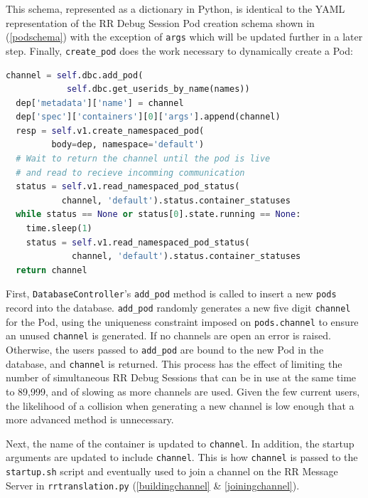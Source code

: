 \documentclass[12pt]{article}
\begin{document}
This schema, represented as a dictionary in Python, is identical to
the YAML representation of the RR Debug Session Pod creation schema
shown in (\ref{podschema}) with the exception of \lstinline{args}
which will be updated further in a later step.  Finally,
\lstinline{create_pod} does the
work necessary to dynamically create a Pod:

\begin{lstlisting}[language=Python,basicstyle=\linespread{0.5}\ttfamily,caption={Pod Creation 3},captionpos=b]
  channel = self.dbc.add_pod(
            self.dbc.get_userids_by_name(names))
  dep['metadata']['name'] = channel
  dep['spec']['containers'][0]['args'].append(channel)
  resp = self.v1.create_namespaced_pod(
         body=dep, namespace='default')
  # Wait to return the channel until the pod is live
  # and read to recieve incomming communication
  status = self.v1.read_namespaced_pod_status(
           channel, 'default').status.container_statuses
  while status == None or status[0].state.running == None:
    time.sleep(1)
    status = self.v1.read_namespaced_pod_status(
             channel, 'default').status.container_statuses
  return channel
\end{lstlisting}

First, \lstinline{DatabaseController}'s \lstinline{add_pod} method is
called to insert a new \lstinline{pods} record into the database.
\lstinline{add_pod} randomly generates a new five digit
\lstinline{channel} for the Pod, using the uniqueness constraint
imposed on \lstinline{pods.channel} to ensure an unused
\lstinline{channel} is generated.  If no channels are open an error is
raised.  Otherwise, the users passed to \lstinline{add_pod} are bound
to the new Pod in the database, and \lstinline{channel} is returned.
This process has the effect of limiting the number of simultaneous RR
Debug Sessions that can be in use at the same time to 89,999, and of
slowing as more channels are used.  Given the few current users, the
likelihood of a collision when generating a new channel is low enough
that a more advanced method is unnecessary.
\par

Next, the name of the container is updated to \lstinline{channel}.  In
addition, the startup arguments are updated to include
\lstinline{channel}.  This is how \lstinline{channel} is passed to the
\lstinline{startup.sh} script and eventually used to join a channel on
the RR Message Server in \lstinline{rrtranslation.py}
(\ref{buildingchannel} \& \ref{joiningchannel}).
\par
\end{document}
